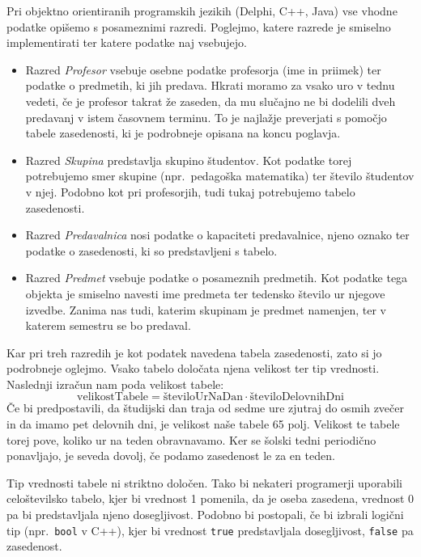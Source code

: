 \documentclass[10pt, a4paper]{article}
\begin{document}
Pri objektno orientiranih programskih jezikih (Delphi, C++, Java) vse vhodne podatke
opišemo s posameznimi razredi. Poglejmo, katere razrede je smiselno implementirati ter
katere podatke naj vsebujejo.
\begin{itemize}
   \item
      Razred \emph{Profesor} vsebuje osebne podatke profesorja (ime in priimek) ter
      podatke o predmetih, ki jih predava. Hkrati moramo za vsako uro v tednu vedeti, če
      je profesor takrat že zaseden, da mu slučajno ne bi dodelili dveh predavanj v istem
      časovnem terminu. To je najlažje preverjati s pomočjo tabele zasedenosti, ki je
      podrobneje opisana na koncu poglavja.
   \item
      Razred \emph{Skupina} predstavlja skupino študentov. Kot podatke torej potrebujemo
      smer skupine (npr.\ pedagoška matematika) ter število študentov v njej. Podobno kot pri
      profesorjih, tudi tukaj potrebujemo tabelo zasedenosti.
   \item
      Razred \emph{Predavalnica} nosi podatke o kapaciteti predavalnice, njeno oznako
      ter podatke o zasedenosti, ki so predstavljeni s tabelo.
   \item
      Razred \emph{Predmet} vsebuje podatke o posameznih predmetih. Kot podatke tega
      objekta je smiselno navesti ime predmeta ter tedensko število ur njegove izvedbe.
      Zanima nas tudi, katerim skupinam je predmet namenjen, ter v katerem semestru se bo
      predaval.
\end{itemize}
\noindent
Kar pri treh razredih je kot podatek navedena tabela zasedenosti, zato si jo podrobneje
oglejmo. Vsako tabelo določata njena velikost ter tip vrednosti. Naslednji izračun nam
poda velikost tabele:
\[
   \text{velikostTabele} = \text{številoUrNaDan} \cdot \text{številoDelovnihDni}
\]
Če bi predpostavili, da študijski dan traja od sedme ure zjutraj do osmih zvečer in da
imamo pet delovnih dni, je velikost naše tabele 65 polj. Velikost te tabele torej pove,
koliko ur na teden obravnavamo. Ker se šolski tedni periodično ponavljajo, je seveda
dovolj, če podamo zasedenost le za en teden.

Tip vrednosti tabele ni striktno določen. Tako bi nekateri programerji uporabili
celoštevilsko tabelo, kjer bi vrednost 1 pomenila, da je oseba zasedena, vrednost 0
pa bi predstavljala njeno dosegljivost. Podobno bi postopali, če bi izbrali logični
tip (npr.\ \texttt{bool} v C++), kjer bi vrednost \texttt{true} predstavljala
dosegljivost, \texttt{false} pa zasedenost.
\end{document}

